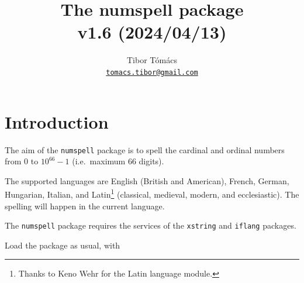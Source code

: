 \documentclass{article}
\newcommand{\commandinline}{\lstinline[
literate={<}{{$\langle$}}1{>}{{$\rangle$}}1,
delim={[is][\color{green!50!black}\normalfont\itshape]{!}{!}},
basicstyle=\color{blue!80!black}\ttfamily,
columns=fullflexible,
keepspaces]}
\begin{document}
\title{The {\bfseries\sffamily numspell} package\\{\large v1.6 (2024/04/13)}}
\author{Tibor Tómács\\{\normalsize\href{mailto:tomacs.tibor@gmail.com}{\texttt{tomacs.tibor@gmail.com}}}}
\date{}
\maketitle

\section{Introduction}
The aim of the \texttt{numspell} package is to spell the cardinal and ordinal numbers from 0 to $10^{66}-1$ (i.e.~maximum 66 digits).

The supported languages are English (British and American), French, German, Hungarian, Italian, and Latin\footnote{Thanks to Keno Wehr for the Latin language module.} (classical, medieval, modern, and ecclesiastic).
The spelling will happen in the current language.

The \texttt{numspell} package requires the services of the \texttt{xstring} and \texttt{iflang} packages.

Load the package as usual, with
\begin{flushleft}
\commandinline|\usepackage{numspell}|
\end{flushleft}
\end{document}
